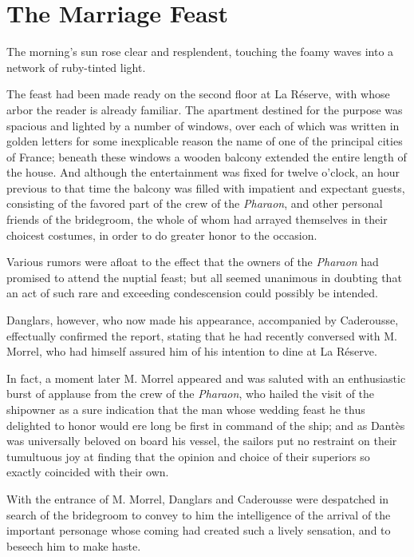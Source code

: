 \chapter{The Marriage Feast}

The morning’s sun rose clear and resplendent, touching the foamy waves
into a network of ruby-tinted light.

The feast had been made ready on the second floor at La Réserve, with
whose arbor the reader is already familiar. The apartment destined for
the purpose was spacious and lighted by a number of windows, over each
of which was written in golden letters for some inexplicable reason the
name of one of the principal cities of France; beneath these windows a
wooden balcony extended the entire length of the house. And although
the entertainment was fixed for twelve o’clock, an hour previous to
that time the balcony was filled with impatient and expectant guests,
consisting of the favored part of the crew of the \textit{Pharaon}, and other
personal friends of the bridegroom, the whole of whom had arrayed
themselves in their choicest costumes, in order to do greater honor to
the occasion.

Various rumors were afloat to the effect that the owners of the
\textit{Pharaon} had promised to attend the nuptial feast; but all seemed
unanimous in doubting that an act of such rare and exceeding
condescension could possibly be intended.

Danglars, however, who now made his appearance, accompanied by
Caderousse, effectually confirmed the report, stating that he had
recently conversed with M. Morrel, who had himself assured him of his
intention to dine at La Réserve.

In fact, a moment later M. Morrel appeared and was saluted with an
enthusiastic burst of applause from the crew of the \textit{Pharaon}, who
hailed the visit of the shipowner as a sure indication that the man
whose wedding feast he thus delighted to honor would ere long be first
in command of the ship; and as Dantès was universally beloved on board
his vessel, the sailors put no restraint on their tumultuous joy at
finding that the opinion and choice of their superiors so exactly
coincided with their own.

With the entrance of M. Morrel, Danglars and Caderousse were despatched
in search of the bridegroom to convey to him the intelligence of the
arrival of the important personage whose coming had created such a
lively sensation, and to beseech him to make haste.

